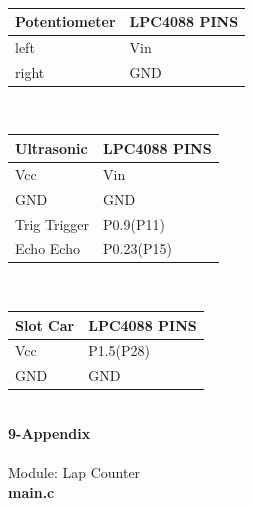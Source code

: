 \documentclass{article}
\begin{document}
\\[1in]
\begin{tabular}{| C{5cm} | C{5cm} |}
\hline
Potentiometer&LPC4088 PINS\\
\hline
left & Vin\\
\hline
right & GND\\
\hline
\end{tabular}
\\[1in]
\begin{tabular}{| C{5cm} | C{5cm} |}
\hline
Ultrasonic&LPC4088 PINS\\
\hline
Vcc & Vin\\
\hline
GND & GND\\
\hline
Trig Trigger & P0.9(P11)\\
\hline
Echo Echo & P0.23(P15)\\
\hline
\end{tabular}
\\[1in]
\begin{tabular}{| C{5cm} | C{5cm} |}
\hline
Slot Car&LPC4088 PINS\\
\hline
Vcc & P1.5(P28)\\
\hline
GND & GND\\
\hline
\end{tabular}
\\
\clearpage
{\huge\textbf {9-Appendix}}
\\
\\[0.2in]
{\huge {Module: Lap Counter}}
\\
\newline
\textbf{main.c}
\end{document}
